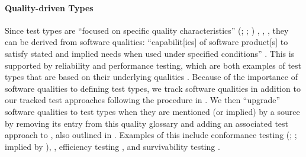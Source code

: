     \paragraph{Quality-driven Types}\label{qual-test}

    Since test types are ``focused on specific quality characteristics''
    \ifnotpaper
        (\citealp[p.~15]{IEEE2022}; \citeyear[p.~7]{IEEE2021};
        \citeyear[p.~473]{IEEE2017})%
    \else
        \cite[p.~15]{IEEE2022}, \cite[p.~7]{IEEE2021}, \cite[p.~473]{IEEE2017}%
    \fi, they can be derived from software qualities: ``capabilit[ies] of
    software product[s] to satisfy stated and implied needs when used under
    specified conditions'' \citep[p.~424]{IEEE2017}. This
    is supported by reliability and performance testing, which are both examples of
    test types \citeyearpar{IEEE2022, IEEE2021} that are based on their underlying
    qualities \citep[p.~18]{FentonAndPfleeger1997}.
    Because of the importance of software qualities to defining test types, we track
    \qualityCount{} software qualities in addition to our
    tracked test approaches following the procedure in .
    We then ``upgrade'' software qualities to test types when they are mentioned
    (or implied) by a source by removing its entry from this quality glossary
    and adding an associated test approach to \ourApproachGlossary{}, also outlined
    in . Examples of this include conformance testing \ifnotpaper
        (\citealp[p.~5\=/7]{SWEBOK2024}; \citealp[p.~25]{JardEtAl1999}; implied
        by \citealp[p.~93]{IEEE2017})\else \cite[p.~5\=/7]{SWEBOK2024},
        \cite[p.~25]{JardEtAl1999}\fi, efficiency testing
    \citep[p.~44]{Kam2008}, and survivability testing \citep[p.~40]{GhoshAndVoas1999}.

